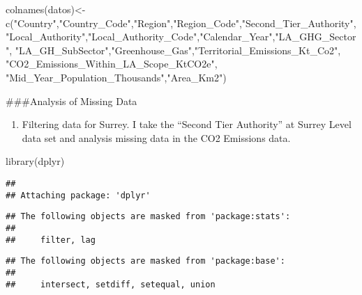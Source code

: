 \documentclass[
]{article}
\newenvironment{Shaded}{\begin{snugshade}}{\end{snugshade}}
\newcommand{\FunctionTok}[1]{\textcolor[rgb]{0.00,0.00,0.00}{#1}}
\newcommand{\NormalTok}[1]{#1}
\newcommand{\OtherTok}[1]{\textcolor[rgb]{0.56,0.35,0.01}{#1}}
\newcommand{\StringTok}[1]{\textcolor[rgb]{0.31,0.60,0.02}{#1}}
\providecommand{\tightlist}{%
  \setlength{\itemsep}{0pt}\setlength{\parskip}{0pt}}
\begin{document}
\begin{Shaded}
\begin{Highlighting}[]
\FunctionTok{colnames}\NormalTok{(datos)}\OtherTok{\textless{}{-}}\FunctionTok{c}\NormalTok{(}\StringTok{"Country"}\NormalTok{,}\StringTok{"Country\_Code"}\NormalTok{,}\StringTok{"Region"}\NormalTok{,}\StringTok{"Region\_Code"}\NormalTok{,}\StringTok{"Second\_Tier\_Authority"}\NormalTok{,}
                    \StringTok{"Local\_Authority"}\NormalTok{,}\StringTok{"Local\_Authority\_Code"}\NormalTok{,}\StringTok{"Calendar\_Year"}\NormalTok{,}\StringTok{"LA\_GHG\_Sector"}\NormalTok{,}
                     \StringTok{"LA\_GH\_SubSector"}\NormalTok{,}\StringTok{"Greenhouse\_Gas"}\NormalTok{,}\StringTok{"Territorial\_Emissions\_Kt\_Co2"}\NormalTok{,}
                    \StringTok{"CO2\_Emissions\_Within\_LA\_Scope\_KtCO2e"}\NormalTok{,}
                     \StringTok{"Mid\_Year\_Population\_Thousands"}\NormalTok{,}\StringTok{"Area\_Km2"}\NormalTok{)}
\end{Highlighting}
\end{Shaded}

\#\#\#Analysis of Missing Data

\begin{enumerate}
\def\labelenumi{\arabic{enumi})}
\tightlist
\item
  Filtering data for Surrey. I take the ``Second Tier Authority'' at
  Surrey Level data set and analysis missing data in the CO2 Emissions
  data.
\end{enumerate}

\begin{Shaded}
\begin{Highlighting}[]
\FunctionTok{library}\NormalTok{(dplyr)}
\end{Highlighting}
\end{Shaded}

\begin{verbatim}
## 
## Attaching package: 'dplyr'
\end{verbatim}

\begin{verbatim}
## The following objects are masked from 'package:stats':
## 
##     filter, lag
\end{verbatim}

\begin{verbatim}
## The following objects are masked from 'package:base':
## 
##     intersect, setdiff, setequal, union
\end{verbatim}
\end{document}
